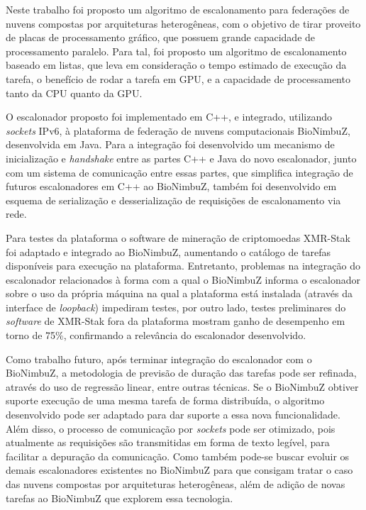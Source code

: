 Neste trabalho foi proposto um algoritmo de escalonamento para federações de nuvens compostas por arquiteturas heterogêneas, com o objetivo de tirar proveito de placas de processamento gráfico, que possuem grande capacidade de processamento paralelo. Para tal, foi proposto um algoritmo de escalonamento baseado em listas, que leva em consideração o tempo estimado de execução da tarefa, o benefício de rodar a tarefa em \acrshort{GPU}, e a capacidade de processamento tanto da \acrshort{CPU} quanto da \acrshort{GPU}.

O escalonador proposto foi implementado em C++, e integrado, utilizando \textit{sockets} \acrshort{IP}v6, à plataforma de federação de nuvens computacionais BioNimbuZ, desenvolvida em Java. Para a integração foi desenvolvido um mecanismo de inicialização e \textit{handshake} entre as partes C++ e Java do novo escalonador, junto com um sistema de comunicação entre essas partes, que simplifica integração de futuros escalonadores em C++ ao BioNimbuZ, também foi desenvolvido em esquema de serialização e desserialização de requisições de escalonamento via rede.

Para testes da plataforma o software de mineração de criptomoedas XMR-Stak foi adaptado e integrado ao BioNimbuZ, aumentando o catálogo de tarefas disponíveis para execução na plataforma. Entretanto, problemas na integração do escalonador relacionados à forma com a qual o BioNimbuZ informa o escalonador sobre o uso da própria máquina na qual a plataforma está instalada (através da interface de \textit{loopback}) impediram testes, por outro lado, testes preliminares do \textit{software} de XMR-Stak fora da plataforma mostram ganho de desempenho em torno de 75\%, confirmando a relevância do escalonador desenvolvido.


Como trabalho futuro, após terminar integração do escalonador com o BioNimbuZ, a metodologia de previsão de duração das tarefas pode ser refinada, através do uso de regressão linear, entre outras técnicas. Se o BioNimbuZ obtiver suporte execução de uma mesma tarefa de forma distribuída, o algoritmo desenvolvido pode ser adaptado para dar suporte a essa nova funcionalidade. Além disso, o processo de comunicação por \textit{sockets} pode ser otimizado, pois atualmente as requisições são transmitidas em forma de texto legível, para facilitar a depuração da comunicação. Como também pode-se buscar evoluir os demais escalonadores existentes no BioNimbuZ para que consigam tratar o caso das nuvens compostas por arquiteturas heterogêneas, além de adição de novas tarefas ao BioNimbuZ que explorem essa tecnologia.

